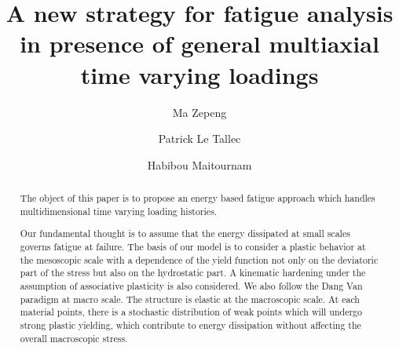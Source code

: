 \documentclass[3p,times,number,review]{elsarticle}
\begin{document}
\begin{frontmatter}



\title{A new strategy for fatigue analysis in presence of general multiaxial time varying loadings}




\author[a]{Ma Zepeng}
\author[b]{Patrick Le Tallec}
\author[c]{Habibou Maitournam}

\address[a]{Laboratory of Solid Mechanics, Ecole Polytechnique, 91128 Palaiseau Cedex, France}
\address[b]{Laboratory of Solid Mechanics, Ecole Polytechnique, 91128 Palaiseau Cedex, France}
\address[c]{IMSIA, ENSTA ParisTech, CNRS, CEA, EDF, Université Paris-Saclay, 828 bd des Maréchaux, 91762 Palaiseau cedex France}

\begin{abstract}
The object of this paper is to propose an energy based fatigue approach which handles multidimensional time varying loading histories.

Our fundamental thought is to assume that the energy dissipated at small scales governs fatigue at failure. The basis of our model is to consider a plastic behavior at the mesoscopic scale with a dependence of the yield function not only on the deviatoric part of the stress but also on the hydrostatic part. A kinematic hardening under the assumption of associative plasticity is also considered. We also follow the Dang Van paradigm at macro scale. The structure is elastic at the macroscopic scale. At each material points, there is a stochastic distribution of weak points which will undergo strong plastic yielding, which contribute to energy dissipation without affecting the overall macroscopic stress.


\end{abstract}
\end{frontmatter}
\end{document}
